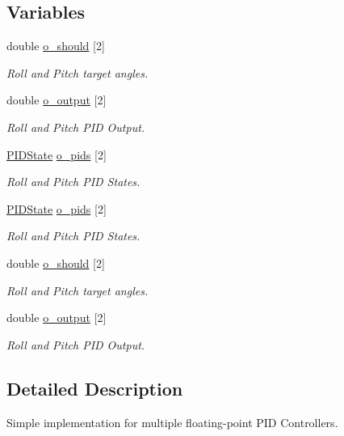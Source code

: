 \subsection*{Variables}
\begin{DoxyCompactItemize}
\item 
double \hyperlink{group__pid_ga3e9b95260c17d0da155fb4eede660d03}{o\-\_\-should} \mbox{[}2\mbox{]}
\begin{DoxyCompactList}\small\item\em Roll and Pitch target angles. \end{DoxyCompactList}\item 
double \hyperlink{group__pid_gaf457b38bb75f72a89bac9b4a9570bd99}{o\-\_\-output} \mbox{[}2\mbox{]}
\begin{DoxyCompactList}\small\item\em Roll and Pitch P\-I\-D Output. \end{DoxyCompactList}\item 
\hyperlink{struct_p_i_d_state}{P\-I\-D\-State} \hyperlink{group__pid_gaf8f428e17178b1f15edba7158fd831da}{o\-\_\-pids} \mbox{[}2\mbox{]}
\begin{DoxyCompactList}\small\item\em Roll and Pitch P\-I\-D States. \end{DoxyCompactList}\item 
\hyperlink{struct_p_i_d_state}{P\-I\-D\-State} \hyperlink{group__pid_gaf8f428e17178b1f15edba7158fd831da}{o\-\_\-pids} \mbox{[}2\mbox{]}
\begin{DoxyCompactList}\small\item\em Roll and Pitch P\-I\-D States. \end{DoxyCompactList}\item 
double \hyperlink{group__pid_ga3e9b95260c17d0da155fb4eede660d03}{o\-\_\-should} \mbox{[}2\mbox{]}
\begin{DoxyCompactList}\small\item\em Roll and Pitch target angles. \end{DoxyCompactList}\item 
double \hyperlink{group__pid_gaf457b38bb75f72a89bac9b4a9570bd99}{o\-\_\-output} \mbox{[}2\mbox{]}
\begin{DoxyCompactList}\small\item\em Roll and Pitch P\-I\-D Output. \end{DoxyCompactList}\end{DoxyCompactItemize}


\subsection{Detailed Description}
Simple implementation for multiple floating-\/point P\-I\-D Controllers. 

